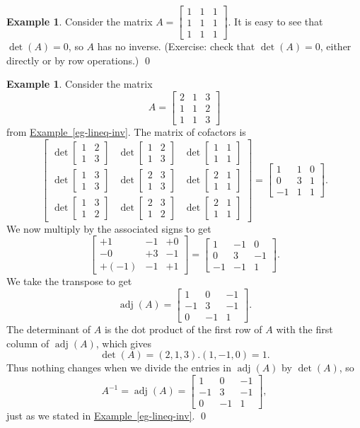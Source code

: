\documentclass[a4paper]{book}
\newcommand{\bbm}       {\begin{bmatrix}}
\newcommand{\ebm}       {\end{bmatrix}}
\newcommand{\adj}       {\operatorname{adj}}
\renewcommand{\:}{\colon}
\newcommand{\biref}[2]{\hyperlink{#2}{#1~\ref*{#2}}}
\theoremstyle{definition}
\newtheorem{example}[theorem]{Example}
\begin{document}
\begin{example}
 Consider the matrix $A=\bbm 1&1&1\\1&1&1\\1&1&1\ebm$.  It is easy to
 see that $\det(A)=0$, so $A$ has no inverse.  (Exercise: check that
 $\det(A)=0$, either directly or by row operations.)
 \qed
\end{example}
\begin{example}
 Consider the matrix 
 \[ A = \bbm 2&1&3\\
             1&1&2\\
             1&1&3 \ebm
 \]
 from \biref{Example}{eg-lineq-inv}.  The matrix of cofactors is 
 \[ \bbm \det\bbm 1&2\\1&3\ebm &
         \det\bbm 1&2\\1&3\ebm &
         \det\bbm 1&1\\1&1\ebm \\
         \det\bbm 1&3\\1&3\ebm &
         \det\bbm 2&3\\1&3\ebm &
         \det\bbm 2&1\\1&1\ebm \\
         \det\bbm 1&3\\1&2\ebm &
         \det\bbm 2&3\\1&2\ebm &
         \det\bbm 2&1\\1&1\ebm  \ebm = 
    \bbm 1&1&0 \\ 0&3&1 \\ -1&1&1 \ebm.
 \]
 We now multiply by the associated signs to get
 \[ \bbm +1&-1&+0 \\ -0&+3&-1 \\ +(-1)&-1&+1 \ebm = 
    \bbm 1&-1&0 \\ 0&3&-1 \\ -1&-1&1 \ebm.
 \]
 We take the transpose to get 
 \[ \adj(A) = \bbm 1&0&-1 \\ -1&3&-1 \\ 0&-1&1 \ebm. \]
 The determinant of $A$ is the dot product of the first row of $A$
 with the first column of $\adj(A)$, which gives
 \[ \det(A) = (2,1,3).(1,-1,0) = 1. \]
 Thus nothing changes when we divide the entries in $\adj(A)$ by
 $\det(A)$, so 
 \[ A^{-1} = \adj(A) = \bbm 1&0&-1 \\ -1&3&-1 \\ 0&-1&1 \ebm, \]
 just as we stated in \biref{Example}{eg-lineq-inv}.
 \qed
\end{example}
\end{document}
